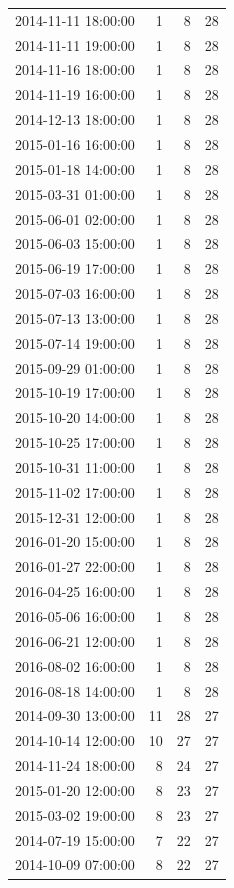 \begin{tabular}{lrrr}
2014-11-11 18:00:00 & 1 & 8 & 28 \\
2014-11-11 19:00:00 & 1 & 8 & 28 \\
2014-11-16 18:00:00 & 1 & 8 & 28 \\
2014-11-19 16:00:00 & 1 & 8 & 28 \\
2014-12-13 18:00:00 & 1 & 8 & 28 \\
2015-01-16 16:00:00 & 1 & 8 & 28 \\
2015-01-18 14:00:00 & 1 & 8 & 28 \\
2015-03-31 01:00:00 & 1 & 8 & 28 \\
2015-06-01 02:00:00 & 1 & 8 & 28 \\
2015-06-03 15:00:00 & 1 & 8 & 28 \\
2015-06-19 17:00:00 & 1 & 8 & 28 \\
2015-07-03 16:00:00 & 1 & 8 & 28 \\
2015-07-13 13:00:00 & 1 & 8 & 28 \\
2015-07-14 19:00:00 & 1 & 8 & 28 \\
2015-09-29 01:00:00 & 1 & 8 & 28 \\
2015-10-19 17:00:00 & 1 & 8 & 28 \\
2015-10-20 14:00:00 & 1 & 8 & 28 \\
2015-10-25 17:00:00 & 1 & 8 & 28 \\
2015-10-31 11:00:00 & 1 & 8 & 28 \\
2015-11-02 17:00:00 & 1 & 8 & 28 \\
2015-12-31 12:00:00 & 1 & 8 & 28 \\
2016-01-20 15:00:00 & 1 & 8 & 28 \\
2016-01-27 22:00:00 & 1 & 8 & 28 \\
2016-04-25 16:00:00 & 1 & 8 & 28 \\
2016-05-06 16:00:00 & 1 & 8 & 28 \\
2016-06-21 12:00:00 & 1 & 8 & 28 \\
2016-08-02 16:00:00 & 1 & 8 & 28 \\
2016-08-18 14:00:00 & 1 & 8 & 28 \\
2014-09-30 13:00:00 & 11 & 28 & 27 \\
2014-10-14 12:00:00 & 10 & 27 & 27 \\
2014-11-24 18:00:00 & 8 & 24 & 27 \\
2015-01-20 12:00:00 & 8 & 23 & 27 \\
2015-03-02 19:00:00 & 8 & 23 & 27 \\
2014-07-19 15:00:00 & 7 & 22 & 27 \\
2014-10-09 07:00:00 & 8 & 22 & 27 \\

\end{tabular}
